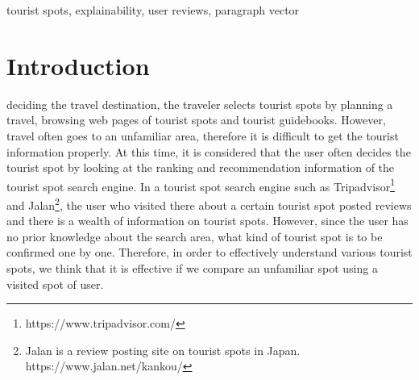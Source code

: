 \documentclass[journal]{IAENGtran}
\begin{document}
\begin{IAENGkeywords}
tourist spots, explainability, user reviews, paragraph vector
\end{IAENGkeywords}

\IAENGpeerreviewmaketitle


\section{Introduction}
\label{sec:Introduction}
 deciding the travel destination, the traveler selects tourist spots by planning a travel, browsing web pages of tourist spots and tourist guidebooks.
However, travel often goes to an unfamiliar area, therefore it is difficult to get the tourist information properly.
At this time, it is considered that the user often decides the tourist spot by looking at the ranking and recommendation information of the tourist spot search engine.
In a tourist spot search engine such as Tripadvisor\footnote{https://www.tripadvisor.com/} and Jalan\footnote{Jalan is a review posting site on tourist spots in Japan. https://www.jalan.net/kankou/}, the user who visited there about a certain tourist spot posted reviews and there is a wealth of information on tourist spots.
However, since the user has no prior knowledge about the search area, what kind of tourist spot is to be confirmed one by one.
Therefore, in order to effectively understand various tourist spots, we think that it is effective if we compare an unfamiliar spot using a visited spot of user.
\end{document}
